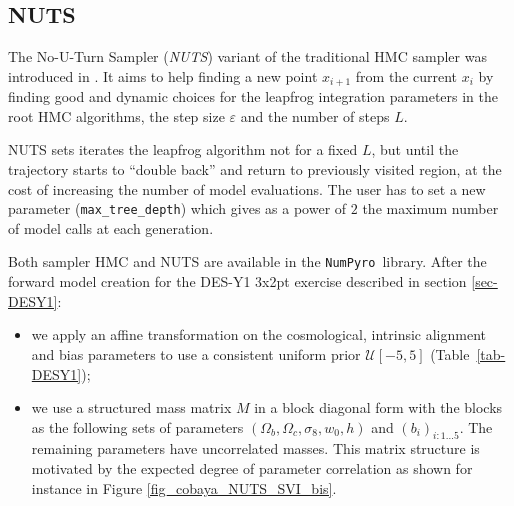 \documentclass[twocolumn,twocolappendix,nofootinbib,iop]{openjournal}
\newcommand{\numpyro}{\texttt{NumPyro}}
\begin{document}
\subsection{NUTS}
\label{sec-NUTS}
%

The No-U-Turn Sampler (\textit{NUTS})  variant of the traditional HMC sampler was introduced in \citet{10.5555/2627435.2638586}. It aims to help finding a new point  $x_{i+1}$ from  the current $x_i$ by finding good and dynamic choices for the leapfrog integration parameters in the root HMC algorithms, the step size $\varepsilon$ and the number of steps $L$.

NUTS sets iterates the leapfrog algorithm not for a fixed $L$, but until the trajectory starts to ``double back'' and return to previously visited region, at the cost of increasing the number of model evaluations. The user has to set a new  parameter  (\texttt{max\_tree\_depth}) which gives as a power of $2$ the maximum number of model calls at each generation.

Both sampler HMC and NUTS are available in the \numpyro\ library. After the forward model creation for the DES-Y1 3x2pt exercise described in section \ref{sec-DESY1}: \begin{itemize}
    \item we apply an affine transformation on the cosmological, intrinsic alignment and bias parameters to use a consistent uniform prior $\mathcal{U}[-5,5]$ (Table~\ref{tab-DESY1});
    \item
    we use a structured mass matrix $M$ in a block diagonal form with the blocks as the following sets of parameters $(\Omega_b,\Omega_c,\sigma_8,w_0,h)$ and $(b_i)_{i:1\dots5}$. The remaining parameters have uncorrelated masses. This matrix structure is motivated by the expected degree of parameter correlation as shown for instance in Figure \ref{fig_cobaya_NUTS_SVI_bis}.
\end{itemize}

\end{document}
